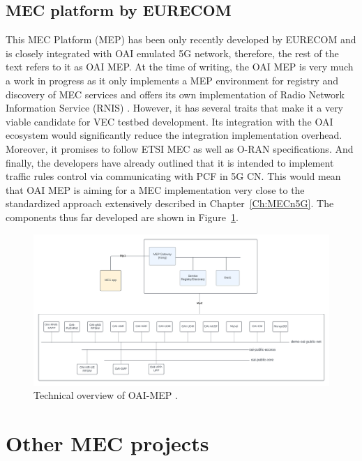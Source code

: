 \documentclass[12pt,a4paper,twoside]{report}
\begin{document}
\subsection{MEC platform by EURECOM}
This MEC Platform (MEP) has been only recently developed by EURECOM and is closely integrated with OAI emulated 5G network, therefore, the rest of the text refers to it as OAI MEP. At the time of writing, the OAI MEP is very much a work in progress as it only implements a MEP environment for registry and discovery of MEC services and offers its own implementation of Radio Network Information Service (RNIS) \cite{oai-mep-git}. However, it has several traits that make it a very viable candidate for VEC testbed development. Its integration with the OAI ecosystem would significantly reduce the integration implementation overhead. Moreover, it promises to follow ETSI MEC as well as O-RAN specifications. And finally, the developers have already outlined that it is intended to implement traffic rules control via communicating with PCF in 5G CN. This would mean that OAI MEP is aiming for a MEC implementation very close to the standardized approach extensively described in Chapter~\ref{Ch:MECn5G}. The components thus far developed are shown in Figure~\ref{F:oai-mep}.
\begin{figure}[ht]
	\centering
	\includegraphics[width=13cm]{./images/OAI-MEP.png}
	\caption{Technical overview of OAI-MEP \cite{oai-mep-git}.}
	\label{F:oai-mep}
\end{figure}

\section{Other MEC projects}
\end{document}
